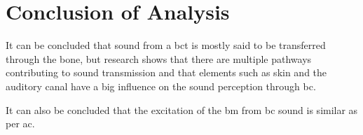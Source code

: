 \section{Conclusion of Analysis}

It can be concluded that sound from a \gls{bct} is mostly said to be transferred through the bone, but research shows that there are multiple pathways contributing to sound transmission and that elements such as skin and the auditory canal have a big influence on the sound perception through \gls{bc}. %

It can also be concluded that the excitation of the \gls{bm} from \gls{bc} sound is similar as per \gls{ac}. %



